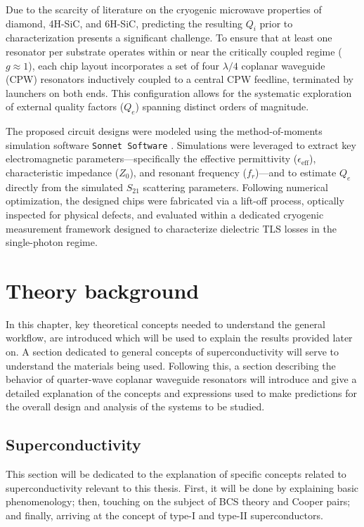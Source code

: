 \documentclass[12pt, a4paper]{article}
\begin{document}
Due to the scarcity of literature on the cryogenic microwave properties of diamond, 4H-SiC, and 6H-SiC, predicting the resulting $Q_i$ prior to characterization presents a significant challenge. To ensure that at least one resonator per substrate operates within or near the critically coupled regime ($g \approx 1$), each chip layout incorporates a set of four $\lambda/4$ coplanar waveguide (CPW) resonators inductively coupled to a central CPW feedline, terminated by launchers on both ends. This configuration allows for the systematic exploration of external quality factors ($Q_e$) spanning distinct orders of magnitude.

The proposed circuit designs were modeled using the method-of-moments simulation software \texttt{Sonnet Software} \cite{zotero-item-361}. Simulations were leveraged to extract key electromagnetic parameters—specifically the effective permittivity ($\epsilon_{\text{eff}}$), characteristic impedance ($Z_0$), and resonant frequency ($f_r$)—and to estimate $Q_e$ directly from the simulated $S_{21}$ scattering parameters. Following numerical optimization, the designed chips were fabricated via a lift-off process, optically inspected for physical defects, and evaluated within a dedicated cryogenic measurement framework designed to characterize dielectric TLS losses in the single-photon regime.

\section{Theory background}

In this chapter, key theoretical concepts needed to understand the general workflow, are introduced which will be used to explain the results provided later on. A section dedicated to general concepts of superconductivity will serve to understand the materials being used. Following this, a section describing the behavior of quarter-wave coplanar waveguide resonators will introduce and give a detailed explanation of the concepts and expressions used to make predictions for the overall design and analysis of the systems to be studied.

\subsection{Superconductivity} \label{Superconductivity}

This section will be dedicated to the explanation of specific concepts related to superconductivity relevant to this thesis. First, it will be done by explaining basic phenomenology; then, touching on the subject of BCS theory and Cooper pairs; and finally, arriving at the concept of type-I and type-II superconductors.
\end{document}
